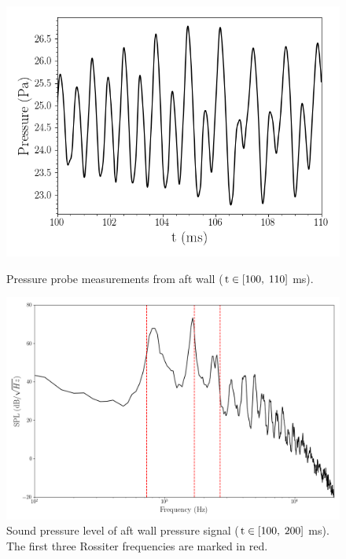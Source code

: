\begin{figure}
	\begin{minipage}{0.48\linewidth}
		\includegraphics[width=0.99\linewidth,trim={0.5em 0.5em 0.5em 0.5em},clip]{Chapters/HPROMResults/Images/cavity/pressure_probe_fom_10ms.png}
		\caption{\label{fig:cavityFOMProbe}Pressure probe measurements from aft wall ($\text{t} \in [100, \; 110]$ ms).}
	\end{minipage} \hspace{0.5em}
	\begin{minipage}{0.48\linewidth}
		\includegraphics[width=0.99\linewidth,trim={0.5em 0.5em 0.5em 0.5em},clip]{Chapters/HPROMResults/Images/cavity/psd_fom_100ms.png}
		\caption{\label{fig:rossiterModeProof}Sound pressure level of aft wall pressure signal ($\text{t} \in [100, \; 200]$ ms). The first three Rossiter frequencies are marked in red.}
	\end{minipage}
\end{figure}

